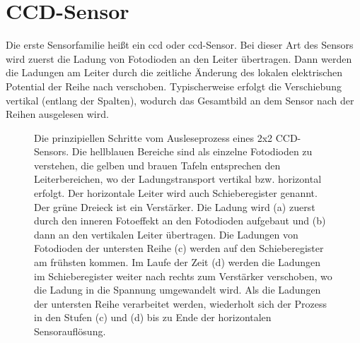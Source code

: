 \section{CCD-Sensor}
Die erste Sensorfamilie heißt ein \gls{ccd} oder \gls{ccd}-Sensor. Bei dieser Art des Sensors wird zuerst die Ladung von Fotodioden an den Leiter übertragen. Dann werden die Ladungen am Leiter durch die zeitliche Änderung des lokalen elektrischen Potential der Reihe nach verschoben. Typischerweise erfolgt die Verschiebung vertikal (entlang der Spalten), wodurch das Gesamtbild an dem Sensor nach der Reihen ausgelesen wird.
\begin{figure}[H]
    \centering
    \caption{Die prinzipiellen Schritte vom Ausleseprozess eines 2x2 CCD-Sensors. Die hellblauen Bereiche sind als einzelne Fotodioden zu verstehen, die gelben und brauen Tafeln entsprechen den Leiterbereichen, wo der Ladungstransport vertikal bzw. horizontal erfolgt. Der horizontale Leiter wird auch Schieberegister genannt. Der grüne Dreieck ist ein Verstärker. Die Ladung wird (a) zuerst durch den inneren Fotoeffekt an den Fotodioden aufgebaut und (b) dann an den vertikalen Leiter übertragen. Die Ladungen von Fotodioden der untersten Reihe (c) werden auf den Schieberegister am frühsten kommen. Im Laufe der Zeit (d) werden die Ladungen im Schieberegister weiter nach rechts zum Verstärker verschoben, wo die Ladung in die Spannung umgewandelt wird. Als die Ladungen der untersten Reihe verarbeitet werden, wiederholt sich der Prozess in den Stufen (c) und (d) bis zu Ende der horizontalen Sensorauflösung.}
    \label{fig:ccd_scheme}
\end{figure}
